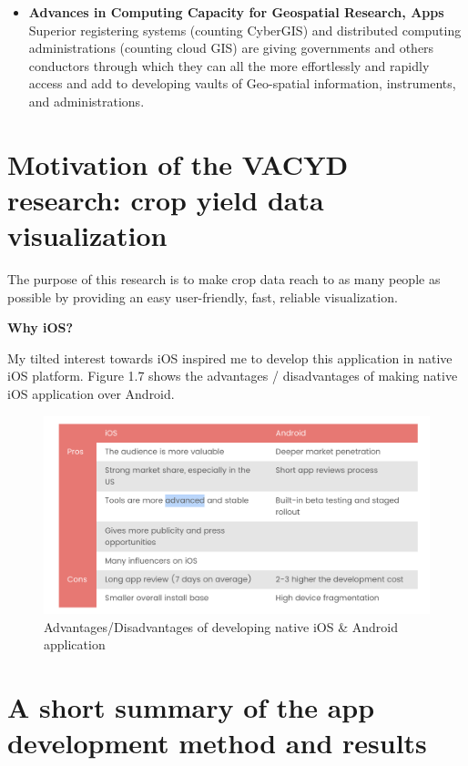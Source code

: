 \begin{itemize}
  \item  \textbf{Advances in Computing Capacity for Geospatial Research, Apps} \\
 Superior registering systems (counting CyberGIS) and distributed computing administrations (counting cloud GIS) are giving governments and others conductors through which they can all the more effortlessly and rapidly access and add to developing vaults of Geo-spatial information, instruments, and administrations.
  
\end{itemize}

\section{Motivation of the VACYD research: crop yield data visualization}

The purpose of this research is to make crop data reach to as many people as possible by providing an easy user-friendly, fast, reliable visualization.


\textbf{Why \gls{iOS}?}

My tilted interest towards \gls{iOS} inspired me to develop this application in native \gls{iOS} platform. Figure 1.7 shows the advantages / disadvantages of making native \gls{iOS} application over Android.

  \begin{figure}[H]
            \centering
            \includegraphics[width=0.8\linewidth]{figures/ch1/iosVSandroid.png}
            \caption{\label{fig:future_work_distribution} Advantages/Disadvantages of developing native iOS \& Android application \cite{theAPPsolutions}}
  \end{figure}


\section{A short summary of the app development method and results}

